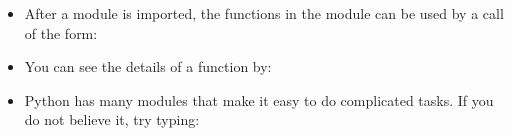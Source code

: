 \documentclass[letterpaper,10pt,english]{sphinxmanual}
\begin{document}
\begin{itemize}
\begin{itemize}
%
\begin{sphinxVerbatim}[commandchars=\\\{\}]
  
\end{sphinxVerbatim}

\end{itemize}

\item {} 
After a module is imported, the functions in the module can be
used by a call of the form:

%
\begin{sphinxVerbatim}[commandchars=\\\{\}]
\end{sphinxVerbatim}

\item {} 
You can see the details of a function by:

%
\begin{sphinxVerbatim}[commandchars=\\\{\}]
\end{sphinxVerbatim}

\item {} 
Python has many modules that make it easy to do
complicated tasks. If you do not believe it, try typing:

%
\begin{sphinxVerbatim}[commandchars=\\\{\}]
 
\end{sphinxVerbatim}

\end{itemize}
\end{document}
